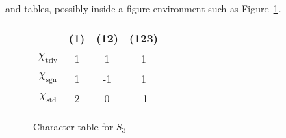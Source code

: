 \documentclass{article}
\begin{document}
and tables, possibly inside a figure environment such as Figure~\ref{fig:char}.

\begin{figure}[h]
\begin{center}
  \begin{tabular}{c|ccc}
& (1)  & (12) & (123) \\
   \hline
   $\chi_\mathrm{triv}$ &  1 &  1 &  1 \\
   $\chi_\mathrm{sgn}$ & 1 & -1 & 1 \\
   $\chi_\mathrm{std}$ & 2 & 0  & -1 \\
\end{tabular}
\end{center}
\caption{Character table for $S_3$}
\label{fig:char}
\end{figure}
\end{document}
